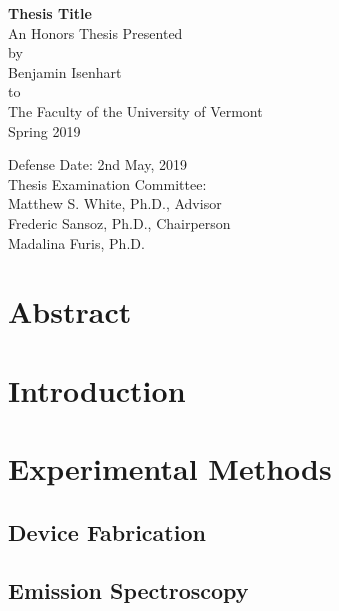 \documentclass{report}
\author{Benjamin Isenhart}
\begin{document}
\begin{titlepage}
	\begin{center}
		\vspace*{2cm}
		\Huge
		\textbf{Thesis Title}\\
		\vspace{1.5cm}
		\LARGE
		An Honors Thesis Presented\\
		by\\
		Benjamin Isenhart\\
		to\\
		The Faculty of the University of Vermont\\
		\vspace{0.5cm}
		Spring 2019
		\vspace{3cm}
	\end{center}
	\begin{flushright}
		\Large
		Defense Date: 2nd May, 2019\\
		Thesis Examination Committee:\\
		Matthew S. White, Ph.D., Advisor\\
		Frederic Sansoz, Ph.D., Chairperson\\
		Madalina Furis, Ph.D.\\
	\end{flushright}
\end{titlepage}

\chapter*{Abstract}

\tableofcontents

\chapter{Introduction}

\chapter{Experimental Methods}

    \section{Device Fabrication}

    \section{Emission Spectroscopy}
\end{document}
